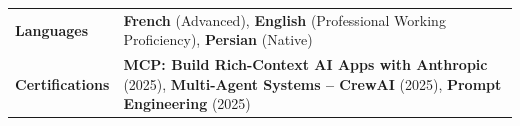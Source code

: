 \documentclass[11pt,a4paper]{article}
\begin{document}
\noindent
\begin{tabularx}{\linewidth}{@{} p{3.2cm} X @{}}
\textbf{Languages} & \textbf{French} (Advanced), \textbf{English} (Professional Working Proficiency), \textbf{Persian} (Native) \\
\textbf{Certifications} & \textbf{MCP: Build Rich-Context AI Apps with Anthropic} (2025), \textbf{Multi-Agent Systems -- CrewAI} (2025), \textbf{Prompt Engineering} (2025) \\
\end{tabularx}
\end{document}
